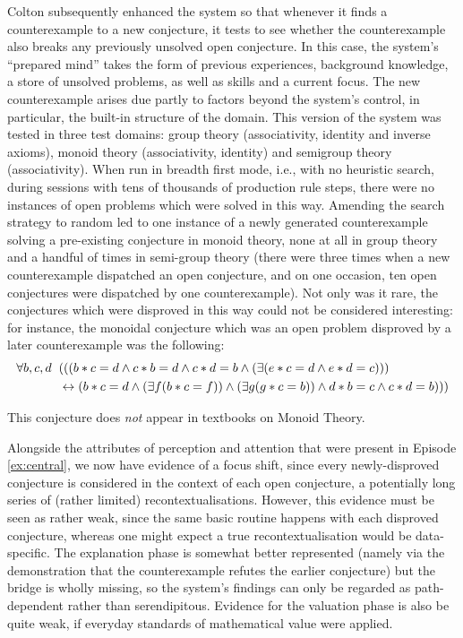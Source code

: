 \begin{ep}\label{ex:monoid}
Colton 
subsequently enhanced the system so that whenever it finds a
counterexample to a new conjecture, it tests to see whether the
counterexample also breaks any previously unsolved open conjecture.
In this case, the system's ``prepared mind'' takes the form of previous
experiences, background knowledge, a store of unsolved problems, as
well as skills and a current focus.  The new counterexample arises
due partly to factors beyond the system's control, in particular, the
built-in structure of the
domain.
This version of the system was tested in three test domains:  group theory (associativity, identity and inverse axioms), monoid theory (associativity, identity) and semigroup theory (associativity). When run in breadth first mode, i.e., with no heuristic search, during sessions with tens of thousands of production rule steps, there were no instances of open problems which were solved in this way. Amending the search strategy to random led to one instance of a newly generated counterexample solving a pre-existing conjecture in monoid theory, none at all in group theory and a handful of times in semi-group theory (there were three times when a new counterexample dispatched an open conjecture, and on one occasion, ten open conjectures were dispatched by one counterexample).  Not only was it rare, the conjectures which were disproved in this way could not be considered interesting: for instance, the monoidal conjecture which was an open problem disproved by a later counterexample was the following:
\begin{align*}
\forall b, c, d &\hspace{.2cm}(((b * c = d \wedge c * b = d \wedge c * d = b \wedge (\exists(e * c = d \wedge e * d = c)))\\
&\hspace{.2cm}\leftrightarrow(b * c = d \wedge (\exists f(b * c = f)) \wedge (\exists g(g * c = b)) \wedge d * b = c \wedge c * d = b)))
\end{align*}

\noindent This conjecture does {\em not} appear in textbooks on Monoid Theory.
\end{ep}

Alongside the attributes of perception and attention that were present
in Episode \ref{ex:central}, we now have evidence of a focus shift,
since every newly-disproved conjecture is considered in the context of
each open conjecture, a potentially long series of (rather limited)
recontextualisations.  However, this evidence must be seen as rather
weak, since the same basic routine happens with each disproved
conjecture, whereas one might expect a true recontextualisation would
be data-specific.
The explanation phase is somewhat better represented (namely via the
demonstration that the counterexample refutes the earlier conjecture)
but the bridge is wholly missing, so the system's findings can only be
regarded as path-dependent rather than serendipitous.
Evidence for the valuation phase is also be
quite weak, if everyday standards of mathematical value were applied.

